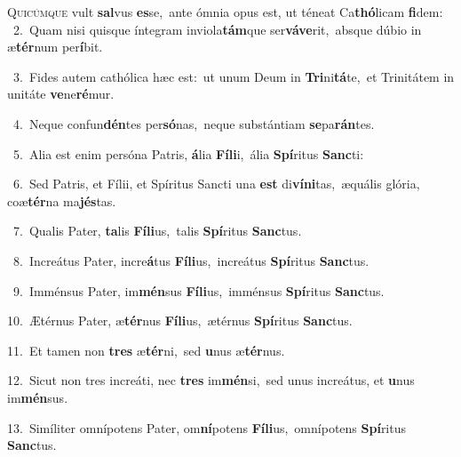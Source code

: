 \lettrine{\initial\textcolor{\initialcolor}{Q}}{uicúmque} vult \textbf{sal}\-vus \textbf{es}\-se,~\star ante ómnia opus est, ut téneat Ca\-\textbf{thó}\-licam \textbf{fi}\-dem:\\
{\numbfont\textcolor{\numbcolor}{~2.}}~Quam nisi quisque íntegram inviola\-\textbf{tám}\-que ser\-\textbf{vá}\-\textbf{ve}rit,~\star absque dúbio in æ\-\textbf{tér}\-num per\-\textbf{í}\-bit.\par
{\numbfont\textcolor{\numbcolor}{~3.}}~Fides autem cathólica hæc est:~\dagger ut unum Deum in \textbf{Tri}\-ni\-\textbf{tá}\-te,~\star et Trinitátem in unitáte \textbf{ve}\-ne\-\textbf{ré}\-mur.\par
{\numbfont\textcolor{\numbcolor}{~4.}}~Neque confun\-\textbf{dén}\-tes per\-\textbf{só}\-nas,~\star neque substántiam \textbf{se}\-pa\-\textbf{rán}\-tes.\par
{\numbfont\textcolor{\numbcolor}{~5.}}~Alia est enim persóna Patris, \textbf{á}\-lia \textbf{Fí}\-\textbf{li}i,~\star ália \textbf{Spí}\-ritus \textbf{Sanc}\-ti:\par
{\numbfont\textcolor{\numbcolor}{~6.}}~Sed Patris, et Fílii, et Spíritus Sancti una \textbf{est} di\-\textbf{ví}\-\textbf{ni}tas,~\star æquális glória, coæ\-\textbf{tér}\-na ma\-\textbf{jés}\-tas.\par
{\numbfont\textcolor{\numbcolor}{~7.}}~Qualis Pater, \textbf{ta}\-lis \textbf{Fí}\-\textbf{li}us,~\star talis \textbf{Spí}\-ritus \textbf{Sanc}\-tus.\par
{\numbfont\textcolor{\numbcolor}{~8.}}~Increátus Pater, incre\-\textbf{á}\-tus \textbf{Fí}\-\textbf{li}us,~\star increátus \textbf{Spí}\-ritus \textbf{Sanc}\-tus.\par
{\numbfont\textcolor{\numbcolor}{~9.}}~Imménsus Pater, im\-\textbf{mén}\-sus \textbf{Fí}\-\textbf{li}us,~\star imménsus \textbf{Spí}\-ritus \textbf{Sanc}\-tus.\par
{\numbfont\textcolor{\numbcolor}{10.}}~Ætérnus Pater, æ\-\textbf{tér}\-nus \textbf{Fí}\-\textbf{li}us,~\star ætérnus \textbf{Spí}\-ritus \textbf{Sanc}\-tus.\par
{\numbfont\textcolor{\numbcolor}{11.}}~Et tamen non \textbf{tres} æ\-\textbf{tér}\-ni,~\star sed \textbf{u}\-nus æ\-\textbf{tér}\-nus.\par
{\numbfont\textcolor{\numbcolor}{12.}}~Sicut non tres increáti, nec \textbf{tres} im\-\textbf{mén}\-si,~\star sed unus increátus, et \textbf{u}\-nus im\-\textbf{mén}\-sus.\par
{\numbfont\textcolor{\numbcolor}{13.}}~Simíliter omnípotens Pater, om\-\textbf{ní}\-potens \textbf{Fí}\-\textbf{li}us,~\star omnípotens \textbf{Spí}\-ritus \textbf{Sanc}\-tus.\par
